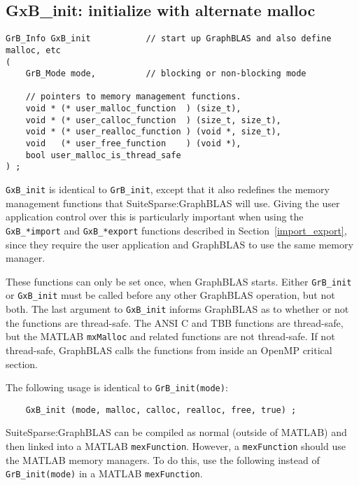 \documentclass[12pt]{article}
\begin{document}
\subsection{{\sf GxB\_init:} initialize with alternate malloc} %
\label{xinit}

\begin{mdframed}[userdefinedwidth=6in]
{\footnotesize
\begin{verbatim}
GrB_Info GxB_init           // start up GraphBLAS and also define malloc, etc
(
    GrB_Mode mode,          // blocking or non-blocking mode

    // pointers to memory management functions.
    void * (* user_malloc_function  ) (size_t),
    void * (* user_calloc_function  ) (size_t, size_t),
    void * (* user_realloc_function ) (void *, size_t),
    void   (* user_free_function    ) (void *),
    bool user_malloc_is_thread_safe
) ;
\end{verbatim}
}\end{mdframed}

\verb'GxB_init' is identical to \verb'GrB_init', except that it also redefines
the memory management functions that SuiteSparse:GraphBLAS will use.  Giving
the user application control over this is particularly important when using the
\verb'GxB_*import' and \verb'GxB_*export' functions described in
Section~\ref{import_export}, since they require the user application and
GraphBLAS to use the same memory manager.

These
functions can only be set once, when GraphBLAS starts.   Either \verb'GrB_init'
or \verb'GxB_init' must be called before any other GraphBLAS operation, but
not both.  The last argument to \verb'GxB_init' informs GraphBLAS as to
whether or not the functions are thread-safe.  The ANSI C and TBB
functions are thread-safe, but the MATLAB \verb'mxMalloc' and related
functions are not thread-safe.  If not thread-safe, GraphBLAS calls
the functions from inside an OpenMP critical section.

The following usage is identical to \verb'GrB_init(mode)':

    {\footnotesize
    \begin{verbatim}
    GxB_init (mode, malloc, calloc, realloc, free, true) ; \end{verbatim}}

SuiteSparse:GraphBLAS can be compiled as normal (outside of MATLAB) and then
linked into a MATLAB \verb'mexFunction'.  However, a \verb'mexFunction' should
use the MATLAB memory managers.  To do this, use the following instead of
\verb'GrB_init(mode)' in a MATLAB \verb'mexFunction'.
\end{document}
